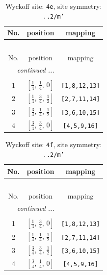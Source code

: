\documentclass[fleqn,8pt]{jsarticle}
\begin{document}
\renewcommand{\arraystretch}{1.2}
\begin{longtable}{ccc}
\caption{Wyckoff site: {\tt 4e}, site symmetry: {\tt ..2/m'}}
 \\
 \hline \hline
No. & position & mapping \\ \hline \endfirsthead

\multicolumn{2}{l}{\tablename\ \thetable{}} \\
 \hline \hline
No. & position & mapping \\ \hline \endhead

 \hline \hline
\multicolumn{2}{r}{\footnotesize\it continued ...} \\ \endfoot

 \hline \hline
\multicolumn{2}{r}{} \\ \endlastfoot

1 & $\left[ \frac{1}{4},\, \frac{1}{4},\, 0 \right]$ & {\tt [1,8,12,13]} \\ \hline
2 & $\left[ \frac{1}{4},\, \frac{3}{4},\, \frac{1}{2} \right]$ & {\tt [2,7,11,14]} \\ \hline
3 & $\left[ \frac{3}{4},\, \frac{1}{4},\, \frac{1}{2} \right]$ & {\tt [3,6,10,15]} \\ \hline
4 & $\left[ \frac{3}{4},\, \frac{3}{4},\, 0 \right]$ & {\tt [4,5,9,16]} \\
\end{longtable}
\renewcommand{\arraystretch}{1.2}
\begin{longtable}{ccc}
\caption{Wyckoff site: {\tt 4f}, site symmetry: {\tt ..2/m'}}
 \\
 \hline \hline
No. & position & mapping \\ \hline \endfirsthead

\multicolumn{2}{l}{\tablename\ \thetable{}} \\
 \hline \hline
No. & position & mapping \\ \hline \endhead

 \hline \hline
\multicolumn{2}{r}{\footnotesize\it continued ...} \\ \endfoot

 \hline \hline
\multicolumn{2}{r}{} \\ \endlastfoot

1 & $\left[ \frac{1}{4},\, \frac{3}{4},\, 0 \right]$ & {\tt [1,8,12,13]} \\ \hline
2 & $\left[ \frac{1}{4},\, \frac{1}{4},\, \frac{1}{2} \right]$ & {\tt [2,7,11,14]} \\ \hline
3 & $\left[ \frac{3}{4},\, \frac{3}{4},\, \frac{1}{2} \right]$ & {\tt [3,6,10,15]} \\ \hline
4 & $\left[ \frac{3}{4},\, \frac{1}{4},\, 0 \right]$ & {\tt [4,5,9,16]} \\
\end{longtable}
\end{document}
